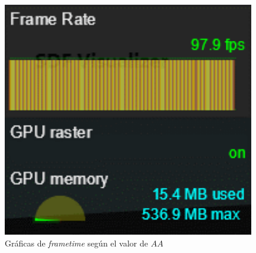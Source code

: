 \begin{figure}[!h]
\begin{minipage}[c]{0.4\linewidth}
        \includegraphics[width=0.98\textwidth]{Plantilla-TFG-master/img/graficas/frametimeB.png}
        \caption{$AA=3$}
     \end{minipage}
     \caption{Gráficas de \textit{frametime} según el valor de $AA$}
     \label{fig:frametime}
\end{figure}


